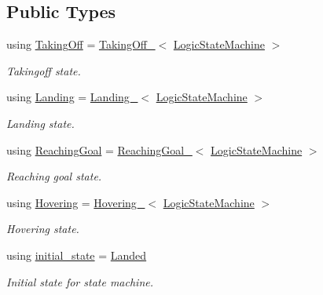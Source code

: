\subsection*{Public Types}
\begin{DoxyCompactItemize}
\item 
using \hyperlink{classLogicStateMachineFrontEnd_a98f3148dbabd87749be3c63ea0ec2a00}{Taking\-Off} = \hyperlink{takeoff__functors_8h_ab6710f3cb12b7653eedcd3a2215d3228}{Taking\-Off\-\_\-}$<$ \hyperlink{basic__state__machine_8h_ab0b6ef21baf57684550a2f05c771bd86}{Logic\-State\-Machine} $>$
\begin{DoxyCompactList}\small\item\em Takingoff state. \end{DoxyCompactList}\item 
using \hyperlink{classLogicStateMachineFrontEnd_acac7938fd313e8808e486fa884ccf49b}{Landing} = \hyperlink{land__functors_8h_a84627965433a60de431758bddec005c3}{Landing\-\_\-}$<$ \hyperlink{basic__state__machine_8h_ab0b6ef21baf57684550a2f05c771bd86}{Logic\-State\-Machine} $>$
\begin{DoxyCompactList}\small\item\em Landing state. \end{DoxyCompactList}\item 
using \hyperlink{classLogicStateMachineFrontEnd_a8a5e85c9d100560fc79f9cbe1bbd5947}{Reaching\-Goal} = \hyperlink{position__control__functors_8h_af380346c24b534da18813f70217ea50f}{Reaching\-Goal\-\_\-}$<$ \hyperlink{basic__state__machine_8h_ab0b6ef21baf57684550a2f05c771bd86}{Logic\-State\-Machine} $>$
\begin{DoxyCompactList}\small\item\em Reaching goal state. \end{DoxyCompactList}\item 
using \hyperlink{classLogicStateMachineFrontEnd_a5877b5b19ba413c2b3bb02ee2459d5ec}{Hovering} = \hyperlink{hovering__functors_8h_a4252f403b3bcd2a850cf271512d9c6ff}{Hovering\-\_\-}$<$ \hyperlink{basic__state__machine_8h_ab0b6ef21baf57684550a2f05c771bd86}{Logic\-State\-Machine} $>$
\begin{DoxyCompactList}\small\item\em Hovering state. \end{DoxyCompactList}\item 
using \hyperlink{classLogicStateMachineFrontEnd_ae617089cdb6687edc5d27b7f8a546af2}{initial\-\_\-state} = \hyperlink{structLogicStateMachineFrontEnd_1_1Landed}{Landed}
\begin{DoxyCompactList}\small\item\em Initial state for state machine. \end{DoxyCompactList}\item 

\end{DoxyCompactItemize}
